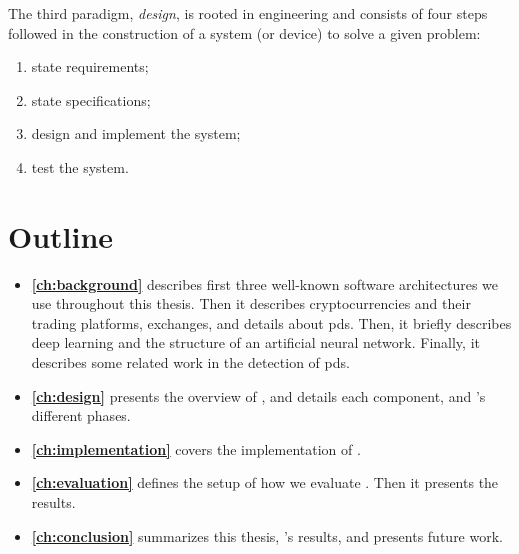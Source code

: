 The third paradigm, \emph{design}, is rooted in engineering and consists of four steps followed in the construction of a system (or device) to solve a given problem:
\begin{enumerate}
    \item state requirements; 
    \item state specifications;
    \item design and implement the system;
    \item test the system.
\end{enumerate}

\section{Outline}\label{sec:outline}
\begin{itemize}
    \item[] \textbf{\autoref{ch:background}} describes first three well-known software architectures we use throughout this thesis. Then it describes cryptocurrencies and their trading platforms, exchanges, and details about \acp{pd}. Then, it briefly describes deep learning and the structure of an artificial neural network. Finally, it describes some related work in the detection of \acp{pd}. 
    \item[] \textbf{\autoref{ch:design}} presents the overview of \project, and details each component, and \project's different phases. 
    \item[] \textbf{\autoref{ch:implementation}} covers the implementation of \project.
    \item[] \textbf{\autoref{ch:evaluation}} defines the setup of how we evaluate \project. Then it presents the results. 
    \item[] \textbf{\autoref{ch:conclusion}} summarizes this thesis, \project's results, and presents future work.
 \end{itemize}